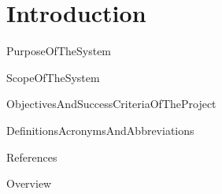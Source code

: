 \chapter{Introduction}


{PurposeOfTheSystem}



{ScopeOfTheSystem}



{ObjectivesAndSuccessCriteriaOfTheProject}



{DefinitionsAcronymsAndAbbreviations}
		
		

{References}	
		
		

{Overview}